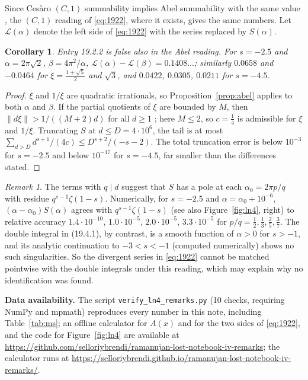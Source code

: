 \documentclass[11pt]{article}
\newtheorem{corollary}[theorem]{Corollary}
\theoremstyle{remark}
\newtheorem{remark}[theorem]{Remark}
\begin{document}
Since Ces\`aro $(C,1)$ summability implies Abel summability with the same value \cite{Hardy}, the $(C,1)$ reading of \eqref{eq:1922},
where it exists, gives the same numbers. Let $\mathcal L(\alpha)$ denote the left side of \eqref{eq:1922} with the series replaced by
$S(\alpha)$.

\begin{corollary}\label{cor:fail}
Entry 19.2.2 is false also in the Abel reading. For $s=-2.5$ and $\alpha=2\pi\sqrt2$, $\beta=4\pi^2/\alpha$,
$\mathcal L(\alpha)-\mathcal L(\beta)=0.1408\ldots$; similarly $0.0658$ and $-0.0464$ for $\xi=\tfrac{1+\sqrt5}2$ and $\sqrt3$, and
$0.0422$, $0.0305$, $0.0211$ for $s=-4.5$.
\end{corollary}

\begin{proof}
$\xi$ and $1/\xi$ are quadratic irrationals, so Proposition~\ref{prop:abel} applies to both $\alpha$ and $\beta$. If the partial quotients of $\xi$ are
bounded by $M$, then $\|d\xi\|>1/((M+2)d)$ for all $d\ge1$ \cite{Kh}; here $M\le2$, so $c=\tfrac14$ is admissible for $\xi$ and $1/\xi$.
Truncating $S$ at $d\le D=4\cdot10^6$, the tail is at most $\sum_{d>D}d^{s+1}/(4c)\le D^{s+2}/(-s-2)$. The total truncation error is
below $10^{-3}$ for $s=-2.5$ and below $10^{-17}$ for $s=-4.5$, far smaller than the differences stated.
\end{proof}

\begin{remark}\label{rem:poles}
The terms with $q\mid d$ suggest that $S$ has a pole at each $\alpha_0=2\pi p/q$ with residue $q^{s-1}\zeta(1-s)$. Numerically,
for $s=-2.5$ and $\alpha=\alpha_0+10^{-6}$, $(\alpha-\alpha_0)S(\alpha)$ agrees with $q^{s-1}\zeta(1-s)$ (see also Figure~\ref{fig:ln4}, right) to relative accuracy
$1.4\cdot10^{-10}$, $1.0\cdot10^{-5}$, $2.0\cdot10^{-5}$, $3.3\cdot10^{-5}$ for $p/q=\tfrac12,\tfrac13,\tfrac25,\tfrac37$. The double
integral in (19.4.1), by contrast, is a smooth function of $\alpha>0$ for $s>-1$, and its analytic continuation to $-3<s<-1$
(computed numerically) shows no such singularities. So the divergent series in \eqref{eq:1922} cannot be matched
pointwise with the double integrals under this reading, which may explain why no identification was found.
\end{remark}

\medskip\noindent\textbf{Data availability.} The script \texttt{verify\_ln4\_remarks.py} (10 checks, requiring NumPy and mpmath)
reproduces every number in this note, including Table~\ref{tab:ms}; an offline calculator for $A(x)$ and for the two sides of
\eqref{eq:1922}, and the code for Figure~\ref{fig:ln4} are available at
\url{https://github.com/selloriybrendi/ramanujan-lost-notebook-iv-remarks}; the calculator runs at
\url{https://selloriybrendi.github.io/ramanujan-lost-notebook-iv-remarks/}.
\end{document}
